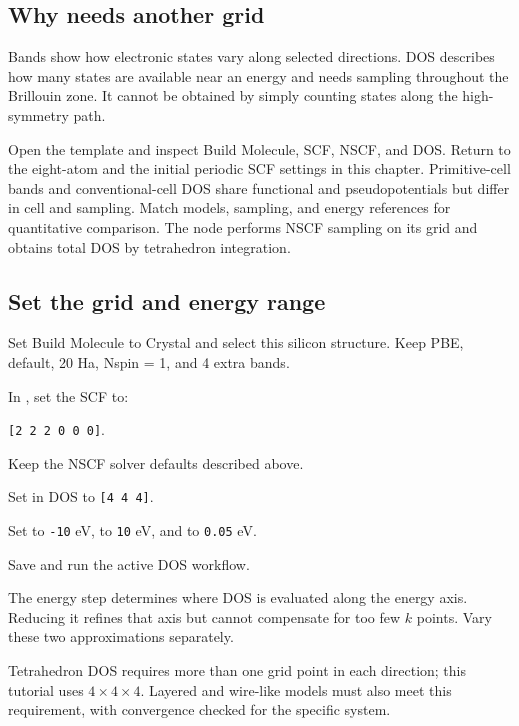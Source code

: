 \subsection{Why  needs another grid}

Bands show how electronic states vary along selected directions. DOS describes how many states are available near an energy and needs sampling throughout the Brillouin zone. It cannot be obtained by simply counting states along the high-symmetry path.

Open the  template and inspect Build Molecule, SCF, NSCF, and DOS. Return to the eight-atom  and the initial periodic SCF settings in this chapter. Primitive-cell bands and conventional-cell DOS share functional and pseudopotentials but differ in cell and sampling. Match models, sampling, and energy references for quantitative comparison. The  node performs NSCF sampling on its grid and obtains total DOS by tetrahedron integration.

\subsection{Set the grid and energy range}

\begin{steps}
\item Set Build Molecule to Crystal and select this silicon structure. Keep PBE, default, 20 Ha, Nspin = 1, and 4 extra bands.
\item In , set the SCF \mbox{} to:
\par\nobreak\noindent\mbox{\texttt{[2 2 2 0 0 0]}}.
\item Keep the NSCF solver defaults described above.
\item Set  in DOS to \texttt{[4 4 4]}.
\item Set  to \texttt{-10} eV,  to \texttt{10} eV, and  to \texttt{0.05} eV.
\item Save and run the active DOS workflow.
\end{steps}

The energy step determines where DOS is evaluated along the energy axis. Reducing it refines that axis but cannot compensate for too few $k$ points. Vary these two approximations separately.

Tetrahedron DOS requires more than one grid point in each direction; this tutorial uses $4\times4\times4$. Layered and wire-like models must also meet this requirement, with convergence checked for the specific system.

